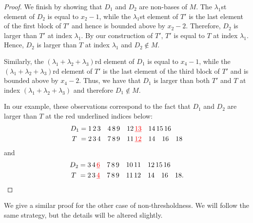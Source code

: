 \documentclass[10pt,a4paper]{amsart}
\theoremstyle{definition}
\theoremstyle{plain}
\begin{document}
\begin{proof}
We finish by showing that $D_1$ and $D_2$ are non-bases of $M$. The $\lambda_1$st element of $D_2$ is equal to $x_2-1$, while the $\lambda_1$st element of $T'$ is the last element of the first block of $T'$ and hence is bounded above by $x_2-2$. Therefore, $D_2$ is larger than $T'$ at index $\lambda_1$. By our construction of $T'$, $T'$ is equal to $T$ at index $\lambda_1$. Hence, $D_2$ is larger than $T$ at index $\lambda_1$ and $D_2\not\in M$. 

Similarly, the $(\lambda_1+\lambda_2+\lambda_3)$rd element of $D_1$ is equal to $x_4-1$, while the $(\lambda_1+\lambda_2+\lambda_3)$rd element of $T'$ is the last element of the third block of $T'$ and is bounded above by $x_4-2$. Thus, we have that $D_1$ is larger than both $T'$ and $T$ at index $(\lambda_1+\lambda_2+\lambda_3)$ and therefore $D_1\not\in M $.

In our example, these observations correspond to the fact that $D_1$ and $D_2$ are larger than $T$ at the red underlined indices below:
\begin{align*}
D_1 = 1\,2\,3\quad 4\, 8\,9\quad 12\,&{\color{red} \underline{13}}\quad 14\,15\,16\\
T\,\,= 2\,3\,4\quad7\,8\,9\quad 11\,&{\color{red}\underline{12}} \quad 14\quad 16\quad 18
\end{align*}
and 
\begin{align*}
D_2 = 3\,4\, &{\color{red}\underline{6}}\quad 7\,8\,9\quad 10\,11\quad 12\, 15\,16\\
T\,\,= 2\,3\,&{\color{red}\underline{4}}\quad7\,8\,9\quad 11\,12 \quad 14\quad 16\quad 18.
\end{align*}
\end{proof}

We give a similar proof for the other case of non-thresholdness. We will follow the same strategy, but the details will be altered slightly.
\end{document}
